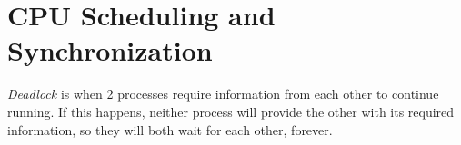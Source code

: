 \section{CPU Scheduling and Synchronization}\label{sec:CPU_Scheduling_Synchronization}

\begin{definition}[Deadlock]\label{def:Deadlock}
  \emph{Deadlock} is when 2 processes require information from each other to continue running.
  If this happens, neither process will provide the other with its required information, so they will both wait for each other, forever.
\end{definition}


